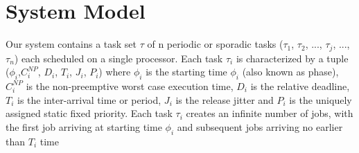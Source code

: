 \section{System Model}\label{sec:system_model}

Our system contains a task set \begin{math}\tau\end{math} of n periodic or sporadic tasks (\begin{math}\tau_{1}\end{math}, \begin{math}\tau_{2}\end{math}, ..., \begin{math}\tau_{j}\end{math}, ..., \begin{math}\tau_{n}\end{math}) each scheduled on a single processor.  Each task \begin{math}\tau_{i}\end{math} is characterized by a tuple (\begin{math}\phi_{i}\end{math},\begin{math}C_{i}^{NP}\end{math}, \begin{math}D_{i}\end{math}, \begin{math}T_{i}\end{math}, \begin{math}J_{i}\end{math}, \begin{math}P_{i}\end{math}) where \begin{math}\phi_{i}\end{math} is the starting time \begin{math}\phi_{i}\end{math} (also known as phase), \begin{math}C_{i}^{NP}\end{math} is the non-preemptive worst case execution time, \begin{math}D_{i}\end{math} is the relative deadline, \begin{math}T_{i}\end{math} is the inter-arrival time or period, \begin{math}J_{i}\end{math} is the release jitter and \begin{math}P_{i}\end{math} is the uniquely assigned static fixed priority.  Each task \begin{math}\tau_{i}\end{math} creates an infinite number of jobs, with the first job arriving at starting time \begin{math}\phi_{i}\end{math} and subsequent jobs arriving no earlier than \begin{math}T_{i}\end{math} time 